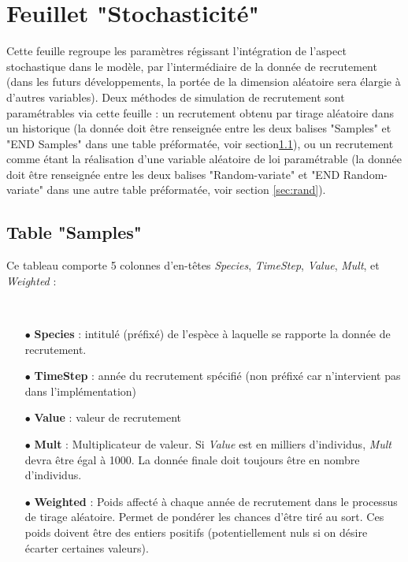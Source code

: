 \documentclass[12pt, colorinlistoftodos]{article}
\newenvironment{not used}[1]{%
    \longtable{%
        |>{\centering$\displaystyle}A{#1}{1}<{$}%
        |}\hline\ignorespaces}{%
    \endlongtable\ignorespacesafterend}
\begin{document}
\section{Feuillet "Stochasticité"}

Cette feuille regroupe les paramètres régissant l'intégration de l'aspect stochastique dans le modèle, par l'intermédiaire de la donnée de recrutement (dans les futurs développements, la portée de la dimension aléatoire sera élargie à d'autres variables). Deux méthodes de simulation de recrutement sont paramétrables via cette feuille : un recrutement obtenu par tirage aléatoire dans un historique (la donnée doit être renseignée entre les deux balises "Samples" et "END Samples" dans une table préformatée, voir section\ref{sec:sample}), ou un recrutement comme étant la réalisation d'une variable aléatoire de loi paramétrable (la donnée doit être renseignée entre les deux balises "Random-variate" et "END Random-variate" dans une autre table préformatée, voir section \ref{sec:rand}).


\subsection{Table "Samples"} \label{sec:sample}

Ce tableau comporte 5 colonnes d'en-têtes \textit{Species}, \textit{TimeStep}, \textit{Value}, \textit{Mult}, et \textit{Weighted} :

\par~\par

\begin{itemize}
    \item[$\bullet$] \textbf{Species} : intitulé (préfixé) de l'espèce à laquelle se rapporte la donnée de recrutement.
    \item[$\bullet$] \textbf{TimeStep} : année du recrutement spécifié (non préfixé car n'intervient pas dans l'implémentation)
    \item[$\bullet$] \textbf{Value} : valeur de recrutement
    \item[$\bullet$] \textbf{Mult} : Multiplicateur de valeur. Si \textit{Value} est en milliers d'individus, \textit{Mult} devra être égal à 1000. La donnée finale doit toujours être en nombre d'individus.
    \item[$\bullet$] \textbf{Weighted} : Poids affecté à chaque année de recrutement dans le processus de tirage aléatoire. Permet de pondérer les chances d'être tiré au sort. Ces poids doivent être des entiers positifs (potentiellement nuls si on désire écarter certaines valeurs).
\end{itemize}
\end{document}
